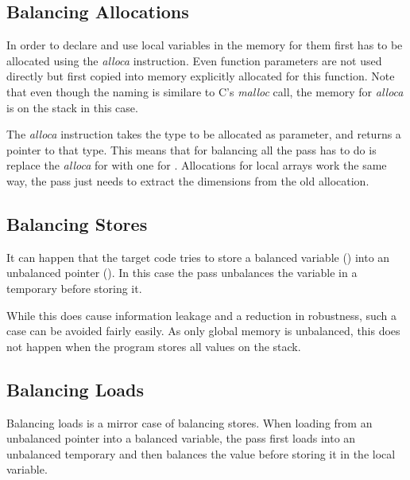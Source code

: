 \subsection{Balancing Allocations}
In order to declare and use local variables in \ir{} the memory for them first has to be allocated using the \emph{alloca} instruction.
Even function parameters are not used directly but first copied into memory explicitly allocated for this function.
Note that even though the naming is similare to C's \emph{malloc} call, the memory for \emph{alloca} is on the stack in this case.

The \emph{alloca} instruction takes the type to be allocated as parameter, and returns a pointer to that type.
This means that for balancing all the pass has to do is replace the \emph{alloca} for  with one for .
Allocations for local arrays work the same way, the pass just needs to extract the dimensions from the old allocation.

\subsection{Balancing Stores}
It can happen that the target code tries to store a balanced variable () into an unbalanced pointer ().
In this case the pass unbalances the variable in a temporary before storing it.

While this does cause information leakage and a reduction in robustness, such a case can be avoided fairly easily.
As only global memory is unbalanced, this does not happen when the program stores all values on the stack.

\subsection{Balancing Loads}
Balancing loads is a mirror case of balancing stores.
When loading from an unbalanced pointer into a balanced variable, the pass first loads into an unbalanced temporary and then balances the value before storing it in the local variable.



